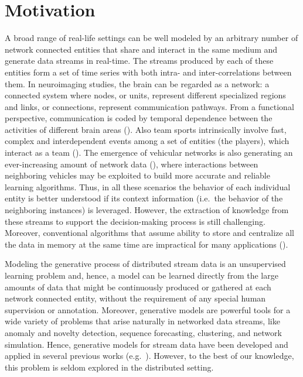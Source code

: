 \section{Motivation}
\label{sec:chp1_motivation}
A broad range of real-life settings can be well modeled by an arbitrary number of network connected entities that share and interact in the same medium and generate data streams in real-time. The streams produced by each of these entities form a set of time series with both intra- and inter-correlations between them. In neuroimaging studies, the brain can be regarded as a network: a connected system where nodes, or units, represent different specialized regions and links, or connections, represent communication pathways. From a functional perspective, communication is coded by temporal dependence between the activities of different brain areas (\citet{DeVicoFallani20130521}). Also team sports intrinsically involve fast, complex and interdependent events among a set of entities (the players), which interact as a team (\citet{Tora2017, Theagarajan2018}). The emergence of vehicular networks is also generating an ever-increasing amount of network data (\citet{Cheng2018}), where interactions between neighboring vehicles may be exploited to build more accurate and reliable learning algorithms. Thus, in all these scenarios the behavior of each individual entity is better understood if its context information (i.e.\ the behavior of the neighboring instances) is leveraged. However, the extraction of knowledge from these streams to support the decision-making process is still challenging. Moreover, conventional algorithms that assume ability to store and centralize all the data in memory at the same time are impractical for many applications (\citet{Gama2007}).

Modeling the generative process of distributed stream data is an unsupervised learning problem and, hence, a model can be learned directly from the large amounts of data that might be continuously produced or gathered at each network connected entity, without the requirement of any special human supervision or annotation. Moreover, generative models are powerful tools for a wide variety of problems that arise naturally in networked data streams, like anomaly and novelty detection, sequence forecasting, clustering, and network simulation. Hence, generative models for stream data have been developed and applied in several previous works (e.g.\ \citet{Laxman2008, Hayat2010, Hofmann2011}). However, to the best of our knowledge, this problem is seldom explored in the  distributed setting.

